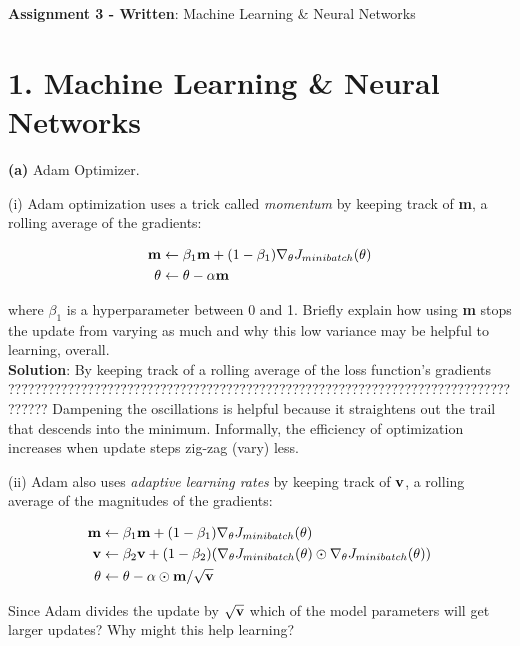 \documentclass[10pt]{article}
\author{Jonathan Tow}
\date{\today}
\title{}
\begin{document}
\textbf{Assignment 3 - Written}: Machine Learning \& Neural Networks


\section*{1. Machine Learning \& Neural Networks}
\label{sec:org73a526c}

\textbf{(a)} Adam Optimizer.

(i) Adam optimization uses a trick called \emph{momentum} by keeping track of \textbf{m}, a rolling average of the gradients:

\begin{LATEX}
\begin{align*}
\bold{m} &\leftarrow \beta_1 \bold{m} + (1-\beta_1) \nabla_{\theta} J_{minibatch}(\theta) \\
\theta &\leftarrow \theta - \alpha\bold{m}
\end{align*}
\end{LATEX}

where \(\beta_1\) is a hyperparameter between 0 and 1. Briefly explain how using \textbf{m} stops the update from varying 
as much and why this low variance may be helpful to learning, overall.\\


\textbf{Solution}: By keeping track of a rolling average of the loss function's gradients 
??????????????????????????????????????????????????????????????????????????????????
Dampening the oscillations is helpful because it straightens out the trail that descends into the minimum. 
Informally, the efficiency of optimization increases when update steps zig-zag (vary) less.

(ii) Adam also uses \emph{adaptive learning rates} by keeping track of \(\bold{v}\), a rolling average of the magnitudes of the gradients:

\begin{LATEX}
\begin{align*}
\bold{m} &\leftarrow \beta_1 \bold{m} + (1-\beta_1) \nabla_{\theta} J_{minibatch}(\theta) \\
\bold{v} &\leftarrow \beta_2 \bold{v} + (1-\beta_2) (\nabla_{\theta} J_{minibatch}(\theta) \odot \nabla_{\theta} J_{minibatch}(\theta))\\
\theta &\leftarrow \theta - \alpha \odot \bold{m} / \sqrt{\bold{v}}
\end{align*}
\end{LATEX}

Since Adam divides the update by \(\sqrt{\bold{v}}\) which of the model parameters will get larger updates? Why might this help 
learning?
\end{document}
